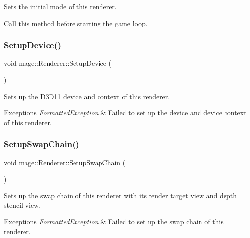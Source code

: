 Sets the initial mode of this renderer.

Call this method before starting the game loop. \hypertarget{classmage_1_1_renderer_aedf5e2e3f73d3d05c09c5fc9f8ac06c3}{}\label{classmage_1_1_renderer_aedf5e2e3f73d3d05c09c5fc9f8ac06c3} 
\subsubsection{\texorpdfstring{Setup\+Device()}{SetupDevice()}}
{\footnotesize\ttfamily void mage\+::\+Renderer\+::\+Setup\+Device (\begin{DoxyParamCaption}{ }\end{DoxyParamCaption})\hspace{0.3cm}{\ttfamily [private]}}

Sets up the D3\+D11 device and context of this renderer.


\begin{DoxyExceptions}{Exceptions}
{\em \hyperlink{structmage_1_1_formatted_exception}{Formatted\+Exception}} & Failed to set up the device and device context of this renderer. \\
\hline
\end{DoxyExceptions}
\hypertarget{classmage_1_1_renderer_a8d3030611390f69120f1e5b91225eddf}{}\label{classmage_1_1_renderer_a8d3030611390f69120f1e5b91225eddf} 
\subsubsection{\texorpdfstring{Setup\+Swap\+Chain()}{SetupSwapChain()}}
{\footnotesize\ttfamily void mage\+::\+Renderer\+::\+Setup\+Swap\+Chain (\begin{DoxyParamCaption}{ }\end{DoxyParamCaption})\hspace{0.3cm}{\ttfamily [private]}}

Sets up the swap chain of this renderer with its render target view and depth stencil view.


\begin{DoxyExceptions}{Exceptions}
{\em \hyperlink{structmage_1_1_formatted_exception}{Formatted\+Exception}} & Failed to set up the swap chain of this renderer. \\
\hline
\end{DoxyExceptions}
\hypertarget{classmage_1_1_renderer_a9004ab608659188900c808eacb5f873c}{}\label{classmage_1_1_renderer_a9004ab608659188900c808eacb5f873c} 

